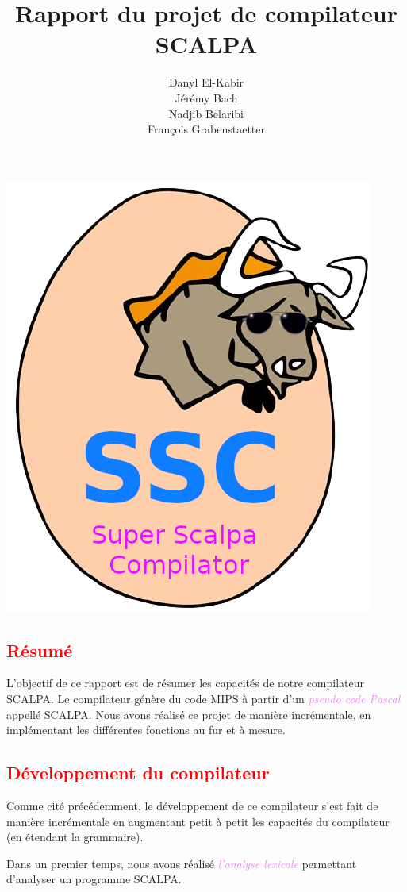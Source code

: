 \documentclass[a4paper]{article}
\title{Rapport du projet de compilateur SCALPA}
\author{Danyl El-Kabir\\Jérémy Bach\\Nadjib Belaribi\\François Grabenstaetter}
\let\oldtextit\textit
\renewcommand{\textit}[1]{\textcolor{violet}{\oldtextit{#1}}}
\newcommand{\csection}[1]{\textcolor{red}{\section{#1}}}
\begin{document}
\sffamily
\everymath{\displaystyle}
\setlength\parindent{0mm}
\setlength{\parskip}{0.2cm}
\maketitle

\begin{center}
    \includegraphics[scale=0.8]{img/scalpa.png}
\end{center}

\newpage
\tableofcontents
\newpage

\csection{Résumé}

L'objectif de ce rapport est de résumer les capacités de notre compilateur SCALPA. Le compilateur génère du code MIPS à partir d'un \textit{pseudo code Pascal} appellé SCALPA. Nous avons réalisé ce projet de manière incrémentale, en implémentant les différentes fonctions au fur et à mesure.

\csection{Développement du compilateur}

Comme cité précédemment, le développement de ce compilateur s'est fait de manière incrémentale en augmentant petit à petit les capacités du compilateur (en étendant la grammaire).

Dans un premier temps, nous avons réalisé \textit{l'analyse lexicale} permettant d'analyser un programme SCALPA.
\end{document}
